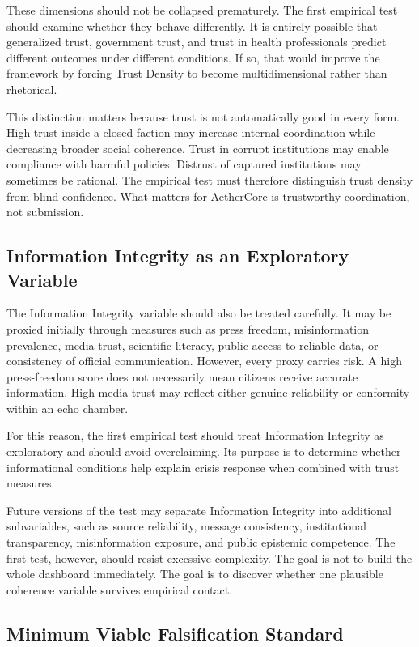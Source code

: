 \documentclass[12pt]{article}
\begin{document}
These dimensions should not be collapsed prematurely. The first empirical test should examine whether they behave differently. It is entirely possible that generalized trust, government trust, and trust in health professionals predict different outcomes under different conditions. If so, that would improve the framework by forcing Trust Density to become multidimensional rather than rhetorical.

This distinction matters because trust is not automatically good in every form. High trust inside a closed faction may increase internal coordination while decreasing broader social coherence. Trust in corrupt institutions may enable compliance with harmful policies. Distrust of captured institutions may sometimes be rational. The empirical test must therefore distinguish trust density from blind confidence. What matters for AetherCore is trustworthy coordination, not submission.

\subsection{Information Integrity as an Exploratory Variable}

The Information Integrity variable should also be treated carefully. It may be proxied initially through measures such as press freedom, misinformation prevalence, media trust, scientific literacy, public access to reliable data, or consistency of official communication. However, every proxy carries risk. A high press-freedom score does not necessarily mean citizens receive accurate information. High media trust may reflect either genuine reliability or conformity within an echo chamber.

For this reason, the first empirical test should treat Information Integrity as exploratory and should avoid overclaiming. Its purpose is to determine whether informational conditions help explain crisis response when combined with trust measures.

Future versions of the test may separate Information Integrity into additional subvariables, such as source reliability, message consistency, institutional transparency, misinformation exposure, and public epistemic competence. The first test, however, should resist excessive complexity. The goal is not to build the whole dashboard immediately. The goal is to discover whether one plausible coherence variable survives empirical contact.

\subsection{Minimum Viable Falsification Standard}
\end{document}
